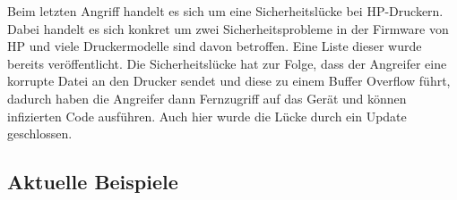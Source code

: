 Beim letzten Angriff handelt es sich um eine Sicherheitslücke bei HP-Druckern. Dabei handelt es sich konkret um zwei
Sicherheitsprobleme in der Firmware von HP und viele Druckermodelle sind davon betroffen. Eine Liste dieser wurde
bereits veröffentlicht. Die Sicherheitslücke hat zur Folge, dass der Angreifer eine korrupte Datei an den Drucker
sendet und diese zu einem Buffer Overflow führt, dadurch haben die Angreifer dann Fernzugriff auf das Gerät und können
infizierten Code ausführen. Auch hier wurde die Lücke durch ein Update geschlossen.
\subsection{Aktuelle Beispiele}

